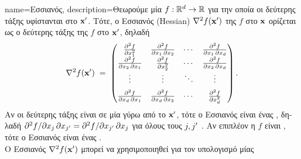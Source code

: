 {name={\foreignlanguage{greek}{Εσσιανός}},
 	description={\foreignlanguage{greek}{Θεωρούμε μία}  
		$f: \mathbb{R}^{d} \to \mathbb{R}$ \foreignlanguage{greek}{για την οποία οι}  
		\foreignlanguage{greek}{δεύτερης τάξης υφίστανται στο ${\bf x}'$. Τότε, ο Εσσιανός} (Hessian) $\nabla^2 f({\bf x}')$ 
		\foreignlanguage{greek}{της $f$ στο ${\bf x}$ ορίζεται ως ο}   
		\foreignlanguage{greek}{δεύτερης τάξης της $f$ στο ${\bf x}'$, δηλαδή}
		$$\nabla^{2} f({\bf x}') \;=\;
		\begin{pmatrix}
			\frac{\partial^{2} f}{\partial x_{1}^{2}}
			& \frac{\partial^{2} f}{\partial x_{1}\, \partial x_{2}}
			& \cdots
			& \frac{\partial^{2} f}{\partial x_{1}\, \partial x_{d}} \\
			\frac{\partial^{2} f}{\partial x_{2}\, \partial x_{1}}
			& \frac{\partial^{2} f}{\partial x_{2}^{2}}
			& \cdots
			& \frac{\partial^{2} f}{\partial x_{2}\, \partial x_{d}} \\
			\vdots & \vdots & \ddots & \vdots \\[1.2ex]
			\frac{\partial^{2} f}{\partial x_{d}\, \partial x_{1}}
			& \frac{\partial^{2} f}{\partial x_{d}\, \partial x_{2}}
			& \cdots
			& \frac{\partial^{2} f}{\partial x_{d}^{2}}
		\end{pmatrix}.$$
		\foreignlanguage{greek}{Αν οι}  \foreignlanguage{greek}{δεύτερης τάξης είναι} 
		 \foreignlanguage{greek}{σε μία}  \foreignlanguage{greek}{γύρω 
		από το ${\bf x}'$, τότε ο Εσσιανός είναι ένας} , \foreignlanguage{greek}{δηλαδή}
		${\partial^{2} f}/{\partial x_{j}\, \partial x_{j'}} = 
		{\partial^{2} f}/{\partial x_{j'}\, \partial x_{j}}$ \foreignlanguage{greek}{για όλους τους} 
		$j, j'$ \cite{RudinBookPrinciplesMatheAnalysis}. \foreignlanguage{greek}{Αν επιπλέον η $f$ είναι}
		, \foreignlanguage{greek}{τότε ο Εσσιανός είναι ένας}  
		 \cite{BoydConvexBook}.\\
		\foreignlanguage{greek}{Ο Εσσιανός $\nabla^2 f({\bf x}')$ μπορεί να χρησιμοποιηθεί για τον υπολογισμό μίας} 
}}
